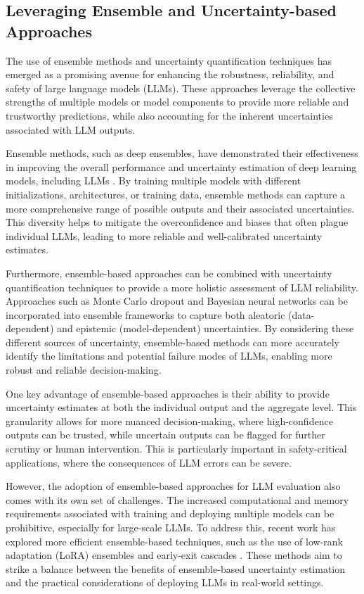 \documentclass[11pt]{article}
\begin{document}
\subsection{Leveraging Ensemble and Uncertainty-based Approaches}

The use of ensemble methods and uncertainty quantification techniques has emerged as a promising avenue for enhancing the robustness, reliability, and safety of large language models (LLMs). These approaches leverage the collective strengths of multiple models or model components to provide more reliable and trustworthy predictions, while also accounting for the inherent uncertainties associated with LLM outputs.

Ensemble methods, such as deep ensembles, have demonstrated their effectiveness in improving the overall performance and uncertainty estimation of deep learning models, including LLMs \cite{ref194,ref195,ref196}. By training multiple models with different initializations, architectures, or training data, ensemble methods can capture a more comprehensive range of possible outputs and their associated uncertainties. This diversity helps to mitigate the overconfidence and biases that often plague individual LLMs, leading to more reliable and well-calibrated uncertainty estimates.

Furthermore, ensemble-based approaches can be combined with uncertainty quantification techniques to provide a more holistic assessment of LLM reliability. Approaches such as Monte Carlo dropout \cite{ref194,ref197} and Bayesian neural networks \cite{ref198,ref195} can be incorporated into ensemble frameworks to capture both aleatoric (data-dependent) and epistemic (model-dependent) uncertainties. By considering these different sources of uncertainty, ensemble-based methods can more accurately identify the limitations and potential failure modes of LLMs, enabling more robust and reliable decision-making.

One key advantage of ensemble-based approaches is their ability to provide uncertainty estimates at both the individual output and the aggregate level. This granularity allows for more nuanced decision-making, where high-confidence outputs can be trusted, while uncertain outputs can be flagged for further scrutiny or human intervention. This is particularly important in safety-critical applications, where the consequences of LLM errors can be severe.

However, the adoption of ensemble-based approaches for LLM evaluation also comes with its own set of challenges. The increased computational and memory requirements associated with training and deploying multiple models can be prohibitive, especially for large-scale LLMs. To address this, recent work has explored more efficient ensemble-based techniques, such as the use of low-rank adaptation (LoRA) ensembles \cite{ref199} and early-exit cascades \cite{ref200}. These methods aim to strike a balance between the benefits of ensemble-based uncertainty estimation and the practical considerations of deploying LLMs in real-world settings.
\end{document}
